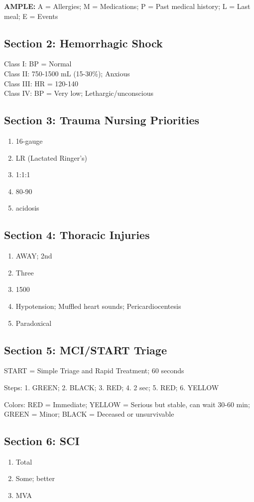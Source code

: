 \documentclass[11pt]{article}
\begin{document}
\textbf{AMPLE:}
A = Allergies; M = Medications; P = Past medical history; L = Last meal; E = Events

\subsection*{Section 2: Hemorrhagic Shock}
Class I: BP = Normal\\
Class II: 750-1500 mL (15-30\%); Anxious\\
Class III: HR = 120-140\\
Class IV: BP = Very low; Lethargic/unconscious

\subsection*{Section 3: Trauma Nursing Priorities}
\begin{enumerate}
    \item 16-gauge
    \item LR (Lactated Ringer's)
    \item 1:1:1
    \item 80-90
    \item acidosis
\end{enumerate}

\subsection*{Section 4: Thoracic Injuries}
\begin{enumerate}
    \item AWAY; 2nd
    \item Three
    \item 1500
    \item Hypotension; Muffled heart sounds; Pericardiocentesis
    \item Paradoxical
\end{enumerate}

\subsection*{Section 5: MCI/START Triage}
START = Simple Triage and Rapid Treatment; 60 seconds

Steps: 1. GREEN; 2. BLACK; 3. RED; 4. 2 sec; 5. RED; 6. YELLOW

Colors: RED = Immediate; YELLOW = Serious but stable, can wait 30-60 min; GREEN = Minor; BLACK = Deceased or unsurvivable

\subsection*{Section 6: SCI}
\begin{enumerate}
    \item Total
    \item Some; better
    \item MVA
\end{enumerate}
\end{document}
